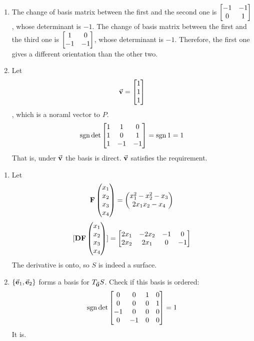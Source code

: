 \documentclass{homework}
\DeclareMathOperator{\sgn}{sgn}
\begin{document}
\begin{problem}{10}
  \begin{enumerate}
    \item
    The change of basis matrix between the first and the second one is
    $\begin{bmatrix}-1 & -1 \\  0 &  1\end{bmatrix}$, whose determinant is $-1$.
    The change of basis matrix between the first and the third one is
    $\begin{bmatrix} 1 &  0 \\ -1 & -1\end{bmatrix}$, whose determinant is $-1$.
    Therefore, the first one gives a different orientation than the other two.
    \item
    Let
    $$\vec{\mathbf{v}} = \begin{bmatrix}1 \\ 1 \\ 1\end{bmatrix}$$
    , which is a noraml vector to $P$.
    $$\sgn \det \bmat{1 & 1 & 0 \\ 1 & 0 & 1 \\ 1 & -1 & -1} = \sgn 1 = 1$$
    That is, under $\vec{\mathbf{v}}$ the basis is direct.
    $\vec{\mathbf{v}}$ satisfies the requirement.
  \end{enumerate}
\end{problem}

\begin{problem}{11}
  \begin{enumerate}
    \item
    Let
      $$\mathbf{F} \begin{pmatrix}x_1 \\ x_2 \\ x_3 \\ x_4\end{pmatrix} = \begin{pmatrix}
        x_1^2 - x_2^2 - x_3 \\
        2x_1x_2 - x_4
      \end{pmatrix}$$
      $$[\mathbf{DF}\begin{pmatrix}x_1 \\ x_2 \\ x_3 \\ x_4\end{pmatrix}] = \begin{bmatrix}
        2x_1 & -2x_2 & -1 &  0 \\
        2x_2 &  2x_1 &  0 & -1
      \end{bmatrix}$$
    The derivative is onto, so $S$ is indeed a surface. \QED
    \item
    $\{\vec{\mathbf{e}}_1, \vec{\mathbf{e}}_2\}$ forms a basis for $T_{\vec{\mathbf{0}}}S$.
    Check if this basis is ordered:
    $$\sgn \det
      \bmat{0 & 0 & 1 & 0 \\
            0 & 0 & 0 & 1 \\
           -1 & 0 & 0 & 0 \\
          0 & -1 & 0 & 0} = 1
    $$
    It is.
  \end{enumerate}
\end{problem}
\end{document}
